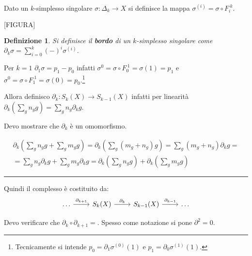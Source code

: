 \documentclass[10pt, twoside=false, x11names]{scrbook}
\newtheorem{definition}[theorem]{Definizione}
\newenvironment{proof}{{\textbf{Dimostrazione}:}}{\hfill\rule{2mm}{2mm} \newline}
\begin{document}
Dato un $ k $-simplesso singolare $ \sigma: \Delta_k \to X $ si definisce la mappa $ \sigma^{(i)} = \sigma \circ F_i^{\; k} $.

[FIGURA]

\begin{definition}
  Si definisce il \textbf{bordo} di un $ k $-simplesso singolare come $ \partial_k \sigma = \sum_{i=0}^{k}(-)^i \sigma^{(i)} $.
\end{definition}

Per $ k = 1 $ $ \partial_1 \sigma = p_1 - p_0 $ infatti $ \sigma^{0} = \sigma \circ F_0^{\; 1} = \sigma(1) = p_1 $ e $ \sigma^{0} = \sigma \circ F_1^{\; 1} = \sigma(0) = p_0 $.\footnote{Tecnicamente si intende $ p_0 = \partial_1 \sigma^{(0)}(1) $ e $ p_1 = \partial_0 \sigma^{(1)}(1) $.}

Allora definisco $ \partial_k: S_k(X) \to S_{k-1}(X) $ infatti per linearità $ \partial_k \left( \sum_g n_g g\right) = \sum_g n_g \partial_k g $.

Devo mostrare che $ \partial_k $ è un omomorfismo.

\begin{proof}
  \begin{gather*}
  \partial_k \left( \sum_g n_g g + \sum_g m_g g\right) = \partial_k \left( \sum_g(m_g + n_g)g \right) = \sum_g (m_g + n_g) \partial_k g = \\
  = \sum_g n_g \partial_k g + \sum_g m_g \partial_k g = \partial_k \left( \sum_g n_g g\right) + \partial_k \left( \sum_g m_g g \right)
\end{gather*}
\end{proof}

Quindi il complesso è costituito da:
\[
  \begin{tikzcd}
   \dots \arrow{r}{\partial_{k+1}} & S_k(X) \arrow{r}{\partial_k} & S_{k-1}(X) \arrow{r}{\partial_{k-1}} & \dots
  \end{tikzcd}
\]

Devo verificare che $ \partial_k \circ \partial_{k+1} = $. Spesso come notazione si pone $ \partial^2 = 0 $.
\end{document}
